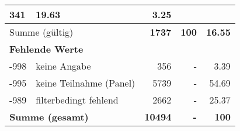 \begin{longtable}{lXrrr}
       \num{341} &
       \num[round-mode=places,round-precision=2]{19.63} &
         \num[round-mode=places,round-precision=2]{3.25} \\
     \midrule
     \multicolumn{2}{l}{Summe (gültig)} &
       \textbf{\num{1737}} &
     \textbf{\num{100}} &
       \textbf{\num[round-mode=places,round-precision=2]{16.55}} \\
     \multicolumn{5}{l}{\textbf{Fehlende Werte}}\\
       -998 &
       keine Angabe &
         \num{356} &
        - &
         \num[round-mode=places,round-precision=2]{3.39} \\
       -995 &
       keine Teilnahme (Panel) &
         \num{5739} &
        - &
         \num[round-mode=places,round-precision=2]{54.69} \\
       -989 &
       filterbedingt fehlend &
         \num{2662} &
        - &
         \num[round-mode=places,round-precision=2]{25.37} \\
     \midrule
     \multicolumn{2}{l}{\textbf{Summe (gesamt)}} &
          \textbf{\num{10494}} &
        \textbf{-} &
        \textbf{\num{100}} \\
     \bottomrule
     \end{longtable}
     
